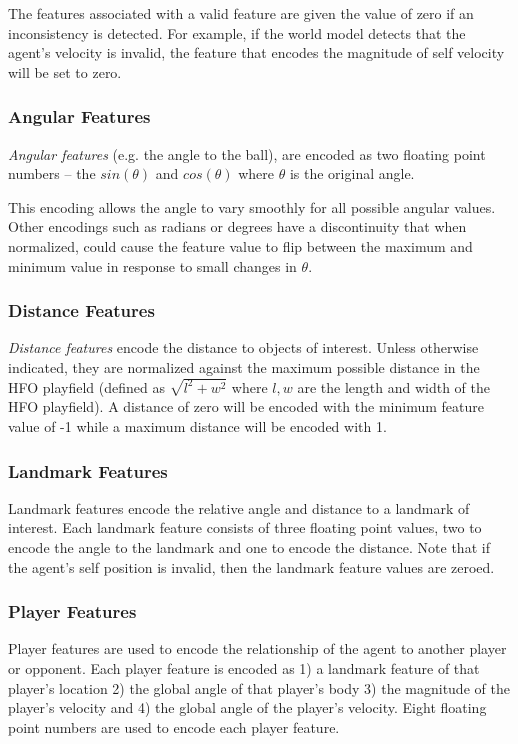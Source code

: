 \documentclass[12pt]{article}
\begin{document}
The features associated with a valid feature are given the value of
zero if an inconsistency is detected. For example, if the world model
detects that the agent's velocity is invalid, the feature that encodes
the magnitude of self velocity will be set to zero.

\subsubsection{Angular Features}

\textit{Angular features} (e.g. the angle to the ball), are encoded as two
floating point numbers -- the $sin(\theta)$ and $cos(\theta)$ where
$\theta$ is the original angle.

This encoding allows the angle to vary smoothly for all possible
angular values. Other encodings such as radians or degrees have a
discontinuity that when normalized, could cause the feature value to
flip between the maximum and minimum value in response to small
changes in $\theta$.

\subsubsection{Distance Features}

\textit{Distance features} encode the distance to objects of
interest. Unless otherwise indicated, they are normalized against the
maximum possible distance in the HFO playfield (defined as $\sqrt{l^2
  + w^2}$ where $l,w$ are the length and width of the HFO
playfield). A distance of zero will be encoded with the minimum
feature value of -1 while a maximum distance will be encoded with 1.

\subsubsection{Landmark Features}

Landmark features encode the relative angle and distance to a landmark
of interest. Each landmark feature consists of three floating point
values, two to encode the angle to the landmark and one to encode the
distance. Note that if the agent's self position is invalid, then the
landmark feature values are zeroed.

\subsubsection{Player Features}

Player features are used to encode the relationship of the agent to
another player or opponent. Each player feature is encoded as 1) a
landmark feature of that player's location 2) the global angle of that
player's body 3) the magnitude of the player's velocity and 4) the
global angle of the player's velocity. Eight floating point numbers
are used to encode each player feature.
\end{document}
